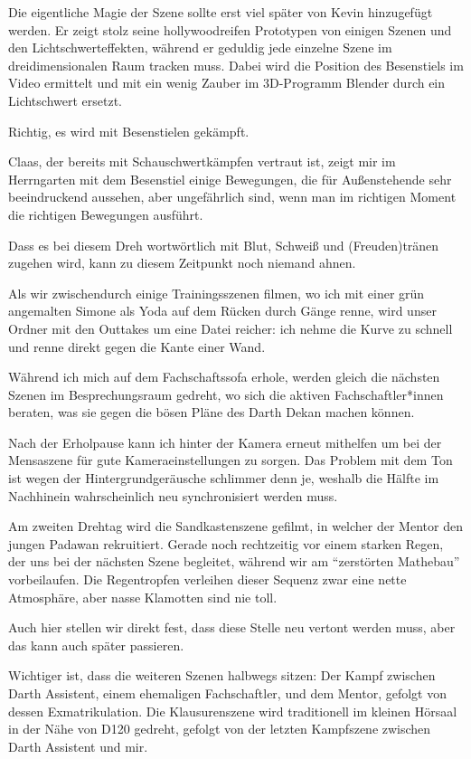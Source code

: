 {

Die eigentliche Magie der Szene sollte erst viel später von Kevin hinzugefügt
werden. Er zeigt stolz seine hollywoodreifen Prototypen von einigen Szenen und
den Lichtschwerteffekten, während er geduldig jede einzelne Szene im
dreidimensionalen Raum tracken muss. Dabei wird die Position des Besenstiels
im Video ermittelt und mit ein wenig Zauber im 3D-Programm Blender durch ein
Lichtschwert ersetzt.


Richtig, es wird mit Besenstielen gekämpft.


Claas, der bereits mit Schauschwertkämpfen vertraut ist, zeigt mir im
Herrngarten mit dem Besenstiel einige Bewegungen, die für Außenstehende sehr
beeindruckend aussehen, aber ungefährlich sind, wenn man im richtigen Moment
die richtigen Bewegungen ausführt.


Dass es bei diesem Dreh wortwörtlich mit Blut, Schweiß und (Freuden)tränen zugehen
wird, kann zu diesem Zeitpunkt noch niemand ahnen.

Als wir zwischendurch
einige Trainingsszenen filmen, wo ich mit einer grün angemalten Simone als Yoda
auf dem Rücken durch Gänge renne, wird unser Ordner mit den Outtakes um eine
Datei reicher: ich nehme die Kurve zu schnell und renne direkt gegen die Kante
einer Wand.


Während ich mich auf dem Fachschaftssofa erhole, werden gleich die nächsten
Szenen im Besprechungsraum gedreht, wo sich die aktiven Fachschaftler*innen
beraten, was sie gegen die bösen Pläne des Darth Dekan machen können.


Nach der Erholpause kann ich hinter der Kamera erneut mithelfen um bei der
Mensaszene für gute Kameraeinstellungen zu sorgen. Das Problem mit dem Ton ist
wegen der Hintergrundgeräusche schlimmer denn je, weshalb die Hälfte im
Nachhinein wahrscheinlich neu synchronisiert werden muss.

Am zweiten Drehtag wird die Sandkastenszene gefilmt, in welcher der Mentor den
jungen Padawan rekruitiert. Gerade noch rechtzeitig vor einem starken Regen,
der uns bei der nächsten Szene begleitet, während wir am \enquote{zerstörten
Mathebau}
vorbeilaufen. Die Regentropfen verleihen dieser Sequenz zwar eine nette
Atmosphäre, aber nasse Klamotten sind nie toll.


Auch hier stellen
wir direkt fest, dass diese Stelle neu vertont werden muss, aber das kann auch
später passieren.


Wichtiger ist, dass die weiteren Szenen halbwegs sitzen: Der Kampf zwischen
Darth Assistent, einem ehemaligen Fachschaftler, und dem Mentor, gefolgt von dessen
Exmatrikulation. Die Klausurenszene wird traditionell im kleinen Hörsaal in der
Nähe von D120 gedreht, gefolgt von der letzten Kampfszene zwischen Darth
Assistent  und
mir.


}
